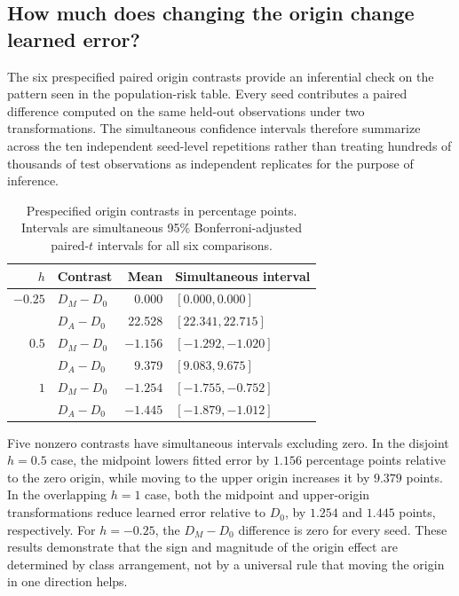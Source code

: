 \documentclass[12pt,a4paper]{article}
\begin{document}
\subsection{How much does changing the origin change learned error?}
The six prespecified paired origin contrasts provide an inferential check on the pattern seen in the population-risk table. Every seed contributes a paired difference computed on the same held-out observations under two transformations. The simultaneous confidence intervals therefore summarize across the ten independent seed-level repetitions rather than treating hundreds of thousands of test observations as independent replicates for the purpose of inference.

\begin{table}[H]
\centering\small
\setlength{\tabcolsep}{3pt}
\caption{Prespecified origin contrasts in percentage points. Intervals are simultaneous 95\% Bonferroni-adjusted paired-$t$ intervals for all six comparisons.}
\label{tab:neural-contrasts}
\begin{tabular}{rlrl}
\toprule
$h$ & Contrast & Mean & Simultaneous interval \\
\midrule
$-0.25$ & $D_M-D_0$ & 0.000 & $[0.000,0.000]$ \\
         & $D_A-D_0$ & 22.528 & $[22.341,22.715]$ \\
$0.5$    & $D_M-D_0$ & $-1.156$ & $[-1.292,-1.020]$ \\
         & $D_A-D_0$ & 9.379 & $[9.083,9.675]$ \\
$1$      & $D_M-D_0$ & $-1.254$ & $[-1.755,-0.752]$ \\
         & $D_A-D_0$ & $-1.445$ & $[-1.879,-1.012]$ \\
\bottomrule
\end{tabular}
\end{table}

Five nonzero contrasts have simultaneous intervals excluding zero. In the disjoint \(h=0.5\) case, the midpoint lowers fitted error by \(1.156\) percentage points relative to the zero origin, while moving to the upper origin increases it by \(9.379\) points. In the overlapping \(h=1\) case, both the midpoint and upper-origin transformations reduce learned error relative to \(D_0\), by \(1.254\) and \(1.445\) points, respectively. For \(h=-0.25\), the \(D_M-D_0\) difference is zero for every seed. These results demonstrate that the sign and magnitude of the origin effect are determined by class arrangement, not by a universal rule that moving the origin in one direction helps.
\end{document}
